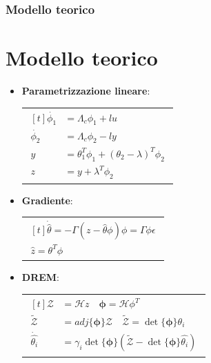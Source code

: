 \documentclass{beamer}
\begin{document}
\begin{frame}
	\frametitle{Modello teorico}
	\section{Modello teorico}
	\begin{itemize}
		\item \textbf{Parametrizzazione lineare}:
		      \begin{tabular}{c}
			      $\begin{aligned}[t]
					       \dot{\phi_{1}} & =\Lambda_{c}\phi_{1}+\textit{l}u
					       \\
					       \dot{\phi_{2}} & =\Lambda_{c}\phi_{2}-\textit{l}y
					       \\
					       y              & =\theta_{1}^{T}\phi_{1}+ {(\theta_{2}-\lambda)}^{T}\phi_{2}
					       \\
					       z              & = y+\lambda^{T}\phi_{2}
				       \end{aligned}$
		      \end{tabular}
		\item \textbf{Gradiente}:
		\begin{tabular}{c}
			      $\begin{aligned}[t]
					       \dot{\hat{\theta}}=-\Gamma{(z-\hat{\theta}\phi)}\phi=\Gamma\phi\epsilon \\
					       \hat{z}=\theta^{T}\phi
				       \end{aligned}$
		\end{tabular}
		\item \textbf{DREM}:
		\begin{tabular}{c}
			$\begin{aligned}[t]
					 \mathcal{Z}& =\mathcal{H}z\quad\boldsymbol{\phi}=\mathcal{H}\phi^{T}\\
					 \tilde{\mathcal{Z}}&=adj\{\boldsymbol{\phi}\}\mathcal{Z}\quad\tilde{\mathcal{Z}}=\det{\{\boldsymbol{\phi}}\}\theta_{i}\\
					 \dot{\hat{\theta_{i}}}&=\gamma_{i}\det{\{\boldsymbol{\phi}\}} (\tilde{\mathcal{Z}}-\det{\{\boldsymbol{\phi}\}}\hat{\theta_{i}})
			\end{aligned}$
  \end{tabular}
	\end{itemize}
\end{frame}
\end{document}
